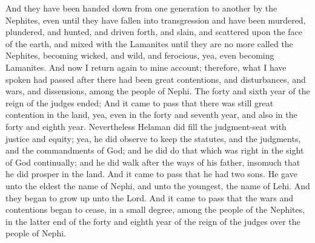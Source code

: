And they have been handed down from one generation to another by the Nephites, even until they have fallen into transgression and have been murdered, plundered, and hunted, and driven forth, and slain, and scattered upon the face of the earth, and mixed with the Lamanites until they are no more called the Nephites, becoming wicked, and wild, and ferocious, yea, even becoming Lamanites.
\bverse \iffalse And now I return again to mine account; therefore, what I have spoken had passed after there had been great contentions, and disturbances, and wars, and dissensions, among the people of Nephi. \fi
And now I return again to mine account; therefore, what I have spoken had passed after there had been great contentions, and disturbances, and wars, and dissensions, among the people of Nephi.
\bverse \iffalse The forty and sixth year of the reign of the judges ended; \fi
The forty and sixth year of the reign of the judges ended;
\bverse \iffalse And it came to pass that there was still great contention in the land, yea, even in the forty and seventh year, and also in the forty and eighth year. \fi
And it came to pass that there was still great contention in the land, yea, even in the forty and seventh year, and also in the forty and eighth year.
\bverse \iffalse Nevertheless Helaman did fill the judgment-seat with justice and equity; yea, he did observe to keep the statutes, and the judgments, and the commandments of God; and he did do that which was right in the sight of God continually; and he did walk after the ways of his father, insomuch that he did prosper in the land. \fi
Nevertheless Helaman did fill the judgment-seat with justice and equity; yea, he did observe to keep the statutes, and the judgments, and the commandments of God; and he did do that which was right in the sight of God continually; and he did walk after the ways of his father, insomuch that he did prosper in the land.
\bverse \iffalse And it came to pass that he had two sons. He gave unto the eldest the name of Nephi, and unto the youngest, the name of Lehi. And they began to grow up unto the Lord. \fi
And it came to pass that he had two sons. He gave unto the eldest the name of Nephi, and unto the youngest, the name of Lehi. And they began to grow up unto the Lord.
\bverse \iffalse And it came to pass that the wars and contentions began to cease, in a small degree, among the people of the Nephites, in the latter end of the forty and eighth year of the reign of the judges over the people of Nephi. \fi
And it came to pass that the wars and contentions began to cease, in a small degree, among the people of the Nephites, in the latter end of the forty and eighth year of the reign of the judges over the people of Nephi.
